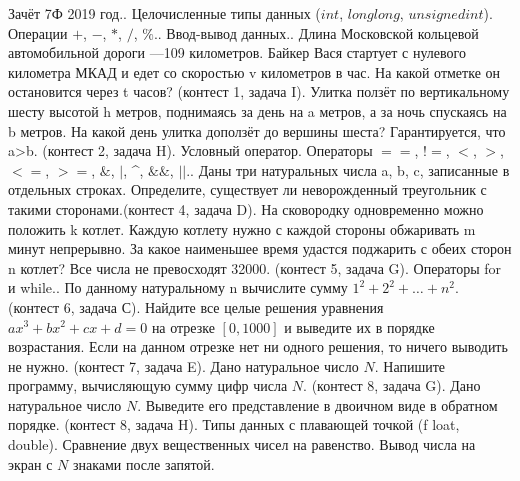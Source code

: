 \documentclass[a4paper,12pt]{article}
\begin{document}
Зачёт 7Ф 2019 год.. Целочисленные типы данных ($int$, $long long$, $unsigned int$). Операции $+$, $-$, $*$, $/$, $\%$.. Ввод-вывод данных.. Длина Московской кольцевой автомобильной дороги —109 километров. Байкер Вася стартует с нулевого километра МКАД и едет со скоростью v километров в час. На какой отметке он остановится через t часов? (контест 1, задача I). Улитка ползёт по вертикальному шесту высотой h метров, поднимаясь за день на a метров, а за ночь спускаясь на b метров. На какой день улитка доползёт до вершины шеста? Гарантируется, что a>b. (контест 2, задача H). Условный оператор. Операторы $==$, $!=$, $<$, $>$, $<=$, $>=$, $\&$, $|$, \textasciicircum, $\&\&$, $||$.. Даны три натуральных числа a, b, c, записанные в отдельных строках. Определите, существует ли неворожденный треугольник с такими сторонами.(контест 4, задача D). На сковородку одновременно можно положить k котлет. Каждую котлету нужно с каждой стороны обжаривать m минут непрерывно. За какое наименьшее время удастся поджарить с обеих сторон n котлет? Все числа не превосходят 32000. (контест 5, задача G). Операторы for и while.. По данному натуральному n вычислите сумму $1^2+2^2+\dots+n^2$. (контест 6, задача С). Найдите все целые решения уравнения $ax^3 + bx^2 + cx + d = 0$ на отрезке $[0,1000]$ и выведите их в порядке возрастания.  Если на данном отрезке нет ни одного решения, то ничего выводить не нужно. (контест 7, задача E). Дано натуральное число $N$. Напишите программу, вычисляющую сумму цифр числа $N$. (контест 8, задача G). Дано натуральное число $N$. Выведите его представление в двоичном виде в обратном порядке. (контест 8, задача H). Типы данных с плавающей точкой (f loat, double). Сравнение двух вещественных чисел на равенство. Вывод числа на экран с $N$ знаками после запятой.\newline
\end{document}
